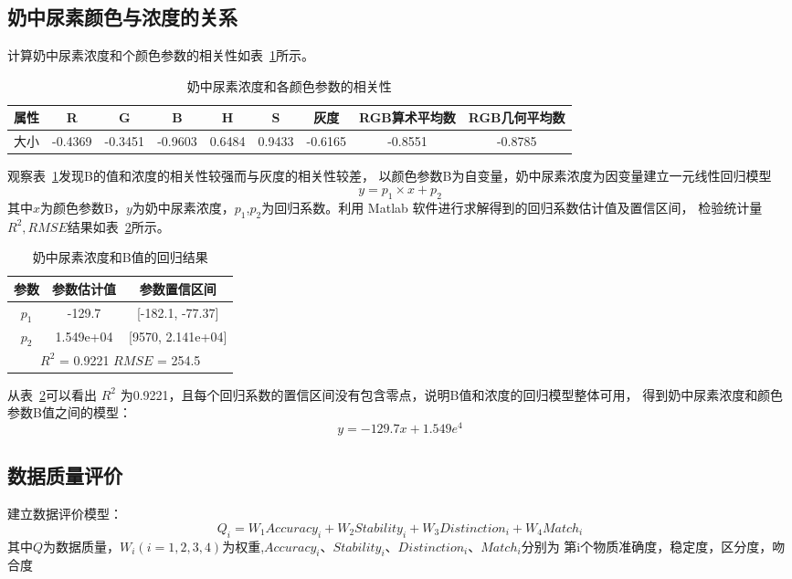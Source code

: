     \subsection{奶中尿素颜色与浓度的关系}
    计算奶中尿素浓度和个颜色参数的相关性如表~\ref{奶中尿素浓度相关性}所示。
    
    \begin{table}[H]
      \centering
      \caption{奶中尿素浓度和各颜色参数的相关性}
      \label{奶中尿素浓度相关性}
      \begin{tabular}{@{}ccccccccc@{}}
      \toprule
      属性 & R  & G & B & H & S&灰度 & RGB算术平均数 & RGB几何平均数\\ \midrule
      大小 & -0.4369 & -0.3451  &-0.9603 & 0.6484 &0.9433 & -0.6165 & -0.8551 & -0.8785\\ \bottomrule
      \end{tabular}
    \end{table}
    
    观察表~\ref{奶中尿素浓度相关性}发现B的值和浓度的相关性较强而与灰度的相关性较差，
    以颜色参数B为自变量，奶中尿素浓度为因变量建立一元线性回归模型
    $$ y = p_1 \times x + p_2$$
    其中$x$为颜色参数B，$y$为奶中尿素浓度，$p_1$,$p_2$为回归系数。利用 Matlab 软件进行求解得到的回归系数估计值及置信区间，
    检验统计量 $R^2, RMSE $结果如表~\ref{奶中尿素和B值回归}所示。
    
    \begin{table}[H]
      \centering
      \caption{奶中尿素浓度和B值的回归结果}
      \label{奶中尿素和B值回归}
      \begin{tabular}{@{}ccc@{}}
      \toprule
      参数       & 参数估计值      & 参数置信区间                   \\ \midrule
      $p_1$     & -129.7     & {[}-182.1, -77.37{]}     \\
      $p_2$     & 1.549e+04   & {[}9570, 2.141e+04{]}    \\
      \hline
      \multicolumn{3}{c}{$R^2$ = 0.9221   $RMSE$ = 254.5} \\ \bottomrule
      \end{tabular}
    \end{table}
    
    从表~\ref{奶中尿素和B值回归}可以看出 $R^2$ 为0.9221，且每个回归系数的置信区间没有包含零点，说明B值和浓度的回归模型整体可用，
    得到奶中尿素浓度和颜色参数B值之间的模型：
    $$ y = -129.7x + 1.549e^{4}$$
    
    \subsection{数据质量评价}
    建立数据评价模型：
    $$Q_i=W_1Accuracy_i+W_2Stability_i+W_3Distinction_i+W_4Match_i$$
    其中$Q$为数据质量，$W_i (i=1,2,3,4)$为权重,$Accuracy_i$、$Stability_i$、$Distinction_i$、$Match_i$分别为
    第i个物质准确度，稳定度，区分度，吻合度

